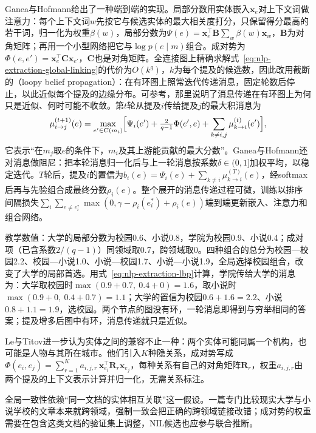 Ganea与Hofmann给出了一种端到端的实现。局部分数用实体嵌入$\bm x_e$对上下文词做注意力：每个上下文词$w$先按它与候选实体的最大相关度打分，只保留得分最高的若干词，归一化为权重$\beta(w)$，局部分数为$\Psi(e)=\bm x_e^\top\bm B\sum_w\beta(w)\bm x_w$，$\bm B$为对角矩阵；再用一个小型网络把它与$\log p(e\mid m)$组合。成对势为$\Phi(e,e')=\bm x_e^\top\bm C\bm x_{e'}$，$\bm C$也是对角矩阵。全连接图上精确求解式~\eqref{eq:nlp-extraction-global-linking}的代价为$O(k^q)$，$k$为每个提及的候选数，因此改用截断的（loopy belief propagation）：在有环图上照常迭代传递消息，固定轮数后停止，以此近似每个提及的边缘分布。可参考，那里说明了消息传递在有环图上为何只是近似、何时可能不收敛。第$t$轮从提及$i$传给提及$j$的最大积消息为
\begin{equation}
  \mu^{(t+1)}_{i\to j}(e)=\max_{e'\in C(m_i)}\Bigl[\Psi_i(e')+\tfrac{2}{q-1}\Phi(e',e)+\sum_{k\neq i,j}\mu^{(t)}_{k\to i}(e')\Bigr],
  \label{eq:nlp-extraction-lbp}
\end{equation}
它表示“在$m_j$取$e$的条件下，$m_i$及其上游能贡献的最大分数”。Ganea与Hofmann还对消息做阻尼：把本轮消息归一化后与上一轮消息按系数$\delta\in(0,1]$加权平均，以稳定迭代。$T$轮后，提及$i$的置信为$b_i(e)=\Psi_i(e)+\sum_{k\neq i}\mu^{(T)}_{k\to i}(e)$，经softmax后再与先验组合成最终分数$\rho_i(e)$。整个展开的消息传递过程可微，训练以排序间隔损失$\sum_i\sum_{e\neq e_i^*}\max(0,\gamma-\rho_i(e_i^*)+\rho_i(e))$端到端更新嵌入、注意力和组合网络。

教学数值：大学的局部分数为校园0.6、小说0.8，学院为校园0.9、小说0.4；成对项（已含系数$2/(q-1)$）同领域取0.7，跨领域取0。四种组合的总分为校园—校园2.2、校园—小说1.0、小说—校园1.7、小说—小说1.9，全局选择校园组合，改变了大学的局部首选。用式~\eqref{eq:nlp-extraction-lbp}计算，学院传给大学的消息为：大学取校园时$\max(0.9+0.7,\ 0.4+0)=1.6$，取小说时$\max(0.9+0,\ 0.4+0.7)=1.1$；大学的置信为校园$0.6+1.6=2.2$、小说$0.8+1.1=1.9$，选校园。两个节点的图没有环，一轮消息即得到与穷举相同的答案；提及增多后图中有环，消息传递就只是近似。

Le与Titov进一步认为实体之间的兼容不止一种：两个实体可能同属一个机构，也可能是人物与其所在城市。他们引入$K$种隐关系，成对势写成$\Phi(e_i,e_j)=\sum_{r=1}^{K}a_{i,j,r}\,\bm x_{e_i}^\top\bm R_r\bm x_{e_j}$，每种关系有自己的对角矩阵$\bm R_r$，权重$a_{i,j,r}$由两个提及的上下文表示计算并归一化，无需关系标注。

全局一致性依赖“同一文档的实体相互关联”这一假设。一篇专门比较现实大学与小说学校的文章本来就跨领域，强制一致会把正确的跨领域链接改错；成对势的权重需要在包含这类文档的验证集上调整，NIL候选也应参与联合推断。

